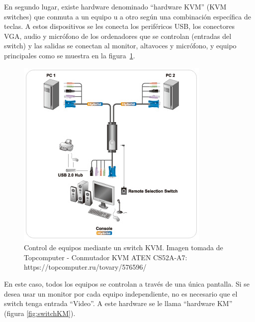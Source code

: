 En segundo lugar, existe hardware denominado ``hardware KVM'' (KVM switches) que conmuta a un equipo u a otro según una combinación específica de teclas. A estos dispositivos se les conecta los periféricos USB, los conectores VGA, audio y micrófono de los ordenadores que se controlan (entradas del switch) y las salidas se conectan al monitor, altavoces y micrófono, y equipo principales como se muestra en la figura~\ref{fig:switchKVM}.

\begin{figure}[h!]
\centering
\includegraphics[scale = 0.7]{capitulo_01/figuras_dir/KVM.jpg}
\caption{Control de equipos mediante un switch KVM. Imagen tomada de Topcomputer - Conmutador KVM ATEN CS52A-A7: https://topcomputer.ru/tovary/576596/}
\label{fig:switchKVM}
\end{figure}

En este caso, todos los equipos se controlan a través de una única pantalla. Si se desea usar un monitor por cada equipo independiente, no es necesario que el switch tenga entrada ``Video''. A este hardware se le llama ``hardware KM'' (figura \ref{fig:switchKM}).

